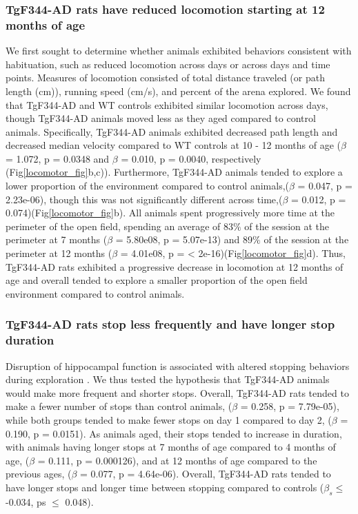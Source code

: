 \documentclass[fleqn,10pt]{wlscirep}
\begin{document}
\subsubsection*{TgF344-AD rats have reduced locomotion starting at 12 months of age}
We first sought to determine whether animals exhibited behaviors consistent with habituation, such as reduced locomotion across days or across days and time points. Measures of locomotion consisted of total distance traveled (or path length (cm)), running speed (cm/s), and percent of the arena explored. We found that TgF344-AD and WT controls exhibited similar locomotion across days, though TgF344-AD animals moved less as they aged compared to control animals. Specifically, TgF344-AD animals exhibited decreased path length and decreased median velocity compared to WT controls at 10 - 12 months of age ($\beta$ = 1.072, p =  0.0348 and $\beta$ = 0.010, p = 0.0040, respectively (Fig\ref{locomotor_fig}b,c)).  Furthermore, TgF344-AD animals tended to explore a lower proportion of the environment compared to control animals,($\beta$ = 0.047, p = 2.23e-06), though this was not significantly different across time,($\beta$ = 0.012, p = 0.074)(Fig\ref{locomotor_fig}b). All animals spent progressively more time at the perimeter of the open field, spending an average of 83$\%$ of the session at the perimeter at 7 months ($\beta$ = 5.80e08, p = 5.07e-13)  and 89$\%$ of the session at the perimeter at 12 months ($\beta$ = 4.01e08, p = < 2e-16)(Fig\ref{locomotor_fig}d). Thus, TgF344-AD rats exhibited a progressive decrease in locomotion at 12 months of age and overall tended to explore a smaller proportion of the open field environment compared to control animals. 

\subsubsection*{TgF344-AD rats stop less frequently and have longer stop duration}   
Disruption of hippocampal function is associated with altered stopping behaviors during exploration \cite{martin_medial_2007}. We thus tested the hypothesis that TgF344-AD animals would make more frequent and shorter stops. Overall, TgF344-AD rats tended to make a fewer number of stops than control animals, ($\beta$ = 0.258, p = 7.79e-05), while both groups tended to make fewer stops on day 1 compared to day 2, ($\beta$ = 0.190, p = 0.0151). As animals aged, their stops tended to increase in duration, with animals having longer stops at 7 months of age compared to 4 months of age, ($\beta$ = 0.111, p = 0.000126), and at 12 months of age compared to the previous ages, ($\beta$ = 0.077, p = 4.64e-06). Overall, TgF344-AD rats tended to have longer stops and longer time between stopping compared to controls ($\beta_s \leq$ -0.034, ps $\leq$ 0.048).
\end{document}
